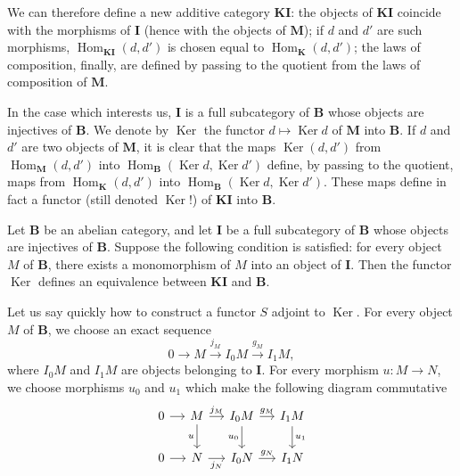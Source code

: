 We can therefore define a new additive category $\mathbf{KI}$: the objects of
$\mathbf{KI}$ coincide with the morphisms of $\mathbf{I}$ (hence with the
objects of $\mathbf{M}$); if $d$ and $d'$ are such morphisms,
$\operatorname{Hom}_{\mathbf{KI}}(d,d')$ is chosen equal to
$\operatorname{Hom}_{\mathbf{K}}(d,d')$; the laws of composition, finally, are
defined by passing to the quotient from the laws of composition of
$\mathbf{M}$.

In the case which interests us, $\mathbf{I}$ is a full subcategory of
$\mathbf{B}$ whose objects are injectives of $\mathbf{B}$. We denote by
$\operatorname{Ker}$ the functor $d\mapsto\operatorname{Ker}d$ of $\mathbf{M}$
into $\mathbf{B}$. If $d$ and $d'$ are two objects of $\mathbf{M}$, it is clear
that the maps $\operatorname{Ker}(d,d')$ from
$\operatorname{Hom}_{\mathbf{M}}(d,d')$ into
$\operatorname{Hom}_{\mathbf{B}}(\operatorname{Ker}d,\operatorname{Ker}d')$
define, by passing to the quotient, maps from
$\operatorname{Hom}_{\mathbf{K}}(d,d')$ into
$\operatorname{Hom}_{\mathbf{B}}(\operatorname{Ker}d,\operatorname{Ker}d')$.
These maps define in fact a functor (still denoted $\operatorname{Ker}$!) of
$\mathbf{KI}$ into $\mathbf{B}$.

\begin{proposition}
Let $\mathbf{B}$ be an abelian category, and let $\mathbf{I}$ be a full
subcategory of $\mathbf{B}$ whose objects are injectives of $\mathbf{B}$.
Suppose the following condition is satisfied: for every object $M$ of
$\mathbf{B}$, there exists a monomorphism of $M$ into an object of
$\mathbf{I}$. Then the functor $\operatorname{Ker}$ defines an equivalence
between $\mathbf{KI}$ and $\mathbf{B}$.
\end{proposition}

Let us say quickly how to construct a functor $S$ adjoint to $\operatorname{Ker}$.
For every object $M$ of $\mathbf{B}$, we choose an exact sequence
\[
  0 \longrightarrow M \xrightarrow{j_M} I_0M \xrightarrow{g_M} I_1M,
\]
where $I_0M$ and $I_1M$ are objects belonging to $\mathbf{I}$. For every
morphism $u\colon M\to N$, we choose morphisms $u_0$ and $u_1$ which make the
following diagram commutative
\[
\begin{tikzcd}[column sep=small]
0 \arrow[r] & M \arrow[r, "{j_M}"] \arrow[d, "u"'] &
I_0M \arrow[r, "{g_M}"] \arrow[d, "u_0"'] & I_1M \arrow[d, "u_1"] \\
0 \arrow[r] & N \arrow[r, "{j_N}"'] &
I_0N \arrow[r, "{g_N}"] & I_1N
\end{tikzcd}
\]

